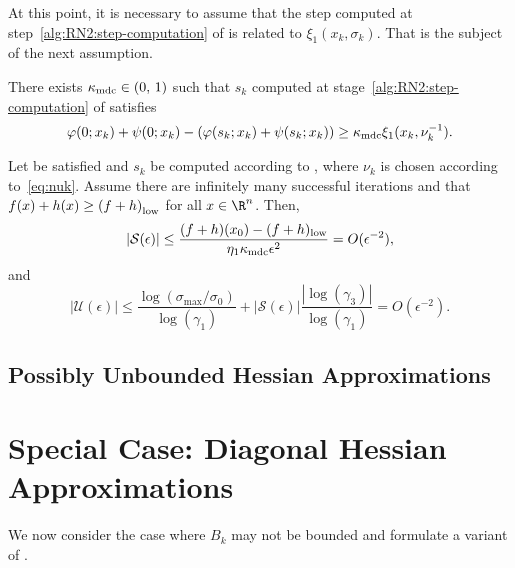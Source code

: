 \documentclass[smallextended]{svjour3}       %
\begin{document}
At this point, it is necessary to assume that the step computed at step~\ref{alg:RN2:step-computation} of  is related to \(\xi_1(x_k, \sigma_k)\).
That is the subject of the next assumption.

\begin{stepassumption}%
  \label{asm:step-computation}
  There exists \(\kappa_{\textup{mdc}} \in (0, \, 1)\) such that \(s_k\) computed at stage~\ref{alg:RN2:step-computation} of  satisfies
  \begin{equation}%
    \label{eq:sufficient-decrease}
    \varphi(0; x_k) + \psi(0; x_k) - (\varphi(s_k; x_k) + \psi(s_k; x_k)) \geq
    \kappa_{\textup{mdc}} \xi_1(x_k, \nu_k^{-1}).
  \end{equation}
\end{stepassumption}

\begin{theorem}%
  \label{thm:lm-complexity-bound}
  Let  be satisfied and \(s_k\) be computed according to , where \(\nu_k\) is chosen according to~\eqref{eq:nuk}.
  Assume there are infinitely many successful iterations and that \(f(x) + h(x) \geq {(f + h)}_{\textup{low}}\) for all \(x \in \R^n\).
  Then,
  \begin{equation}
    \label{eq:lm-bound-Seps}
    |\mathcal{S}(\epsilon)| \leq
    \frac{(f + h)(x_0) - (f + h)_{\textup{low}}}{\eta_1 \kappa_{\textup{mdc}} \epsilon^2} =
    O(\epsilon^{-2}),
  \end{equation}
  and
  \begin{equation}
    \label{eq:lm-bound-Ueps}
    |\mathcal{U}(\epsilon)| \leq
    \frac{\log(\sigma_{\max} / \sigma_0)}{\log(\gamma_1)} + |\mathcal{S}(\epsilon)| \frac{|\log(\gamma_3)|}{\log(\gamma_1)}
    =
    O(\epsilon^{-2}).
  \end{equation}
\end{theorem}

\subsection{Possibly Unbounded Hessian Approximations}%
\label{sec:B-unbounded}


\section{Special Case: Diagonal Hessian Approximations}%
\label{sec:dh}

We now consider the case where \(B_k\) may not be bounded and formulate a variant of \citep[Lemma~\(1\)]{leconte-orban-2023}.
\end{document}
